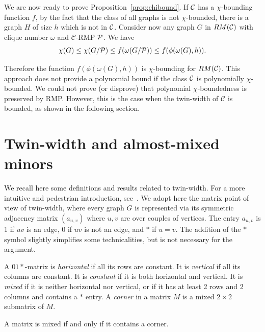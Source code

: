 \documentclass[11pt]{article}
\numberwithin{equation}{section}
\begin{document}
We are now ready to prove Proposition~\ref{prop:chibound}. If $\cal C$ has a $\chi$-bounding function $f$, by the fact that the class of all graphs is not $\chi$-bounded, there is a graph $H$ of size $h$ which is not in $\cal C$. Consider now any graph $G$ in $RM(\cal C)$ with clique number $\omega$ and $\mathcal{C}$-RMP $\cal P$. We have $$\chi (G)\leq \chi (G/{\cal P})\leq f(\omega (G/{\cal P}))\leq f(\phi(\omega(G),h)).$$

Therefore the function $f(\phi(\omega(G),h))$ is $\chi$-bounding for $RM(\cal C)$. This approach does not provide a polynomial bound if the class $\cal C$ is polynomially $\chi$-bounded. We could not prove (or disprove) that polynomial $\chi$-boundedness is preserved by RMP. However, this is the case when the twin-width of $\mathcal{C}$ is bounded, as shown in the following section. 
\section{Twin-width and almost-mixed minors}
  
  We recall here some definitions and results related to twin-width. For a more intuitive and pedestrian introduction, see~\cite{BKTW21}. We adopt here the matrix point of view of twin-width, where every graph $G$ is represented via its symmetric adjacency matrix $(a_{u,v})$ where $u,v$ are over couples of vertices. The entry $a_{u,v}$ is 1 if $uv$ is an edge, 0 if $uv$ is not an edge, and $*$ if $u=v$. The addition of the $*$ symbol slightly simplifies some technicalities, but is not necessary for the argument.
  
    A $01*$-matrix is \emph{horizontal} if all its rows are constant. It is \emph{vertical} if all its columns are constant. It is \emph{constant} if it is both horizontal and vertical. It is \emph{mixed} if it is neither horizontal nor vertical, or if it has at least 2 rows and 2 columns and contains a $*$ entry.
A \emph{corner} in a matrix $M$ is a mixed $2 \times 2$ submatrix of $M$.


\begin{lemma}\label{lem:corner}
 A matrix is mixed if and only if it contains a corner.
\end{lemma}
\end{document}
